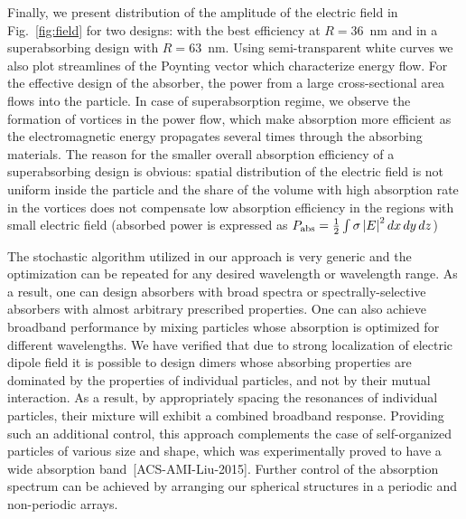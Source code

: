 \documentclass[twoside,twocolumn,9pt]{article}
\begin{document}
\begin{figure}[h]
\end{figure}
Finally, we present distribution of the amplitude of the electric
field in Fig.~\ref{fig:field} for two designs: with the best
efficiency at $R=36$~nm and in a superabsorbing design with $R=63$~nm.
Using semi-transparent white curves we also plot streamlines of the
Poynting vector which characterize energy flow.  For the effective
design of the absorber, the power from a large cross-sectional area
flows into the particle.  In case of superabsorption regime, we
observe the formation of vortices in the power flow, which make
absorption more efficient as the electromagnetic energy propagates
several times through the absorbing materials.  The reason for the
smaller overall absorption efficiency of a superabsorbing design is
obvious: spatial distribution of the electric field is not uniform
inside the particle and the share of the volume with high absorption
rate in the vortices does not compensate low absorption efficiency in
the regions with small electric field (absorbed power is expressed as
$P_{\rm abs}=\frac{1}{2}\int\sigma \left|E\right|^2dx\,dy\,dz$)

The stochastic algorithm utilized in our approach is very generic and
the optimization can be repeated for any desired wavelength or
wavelength range.  As a result, one can design absorbers with broad
spectra or spectrally-selective absorbers with almost arbitrary
prescribed properties.  One can also achieve broadband performance by
mixing particles whose absorption is optimized for different
wavelengths. We have verified that due to strong localization of
electric dipole field it is possible to design dimers whose absorbing
properties are dominated by the properties of individual particles,
and not by their mutual interaction. As a result, by appropriately
spacing the resonances of individual particles, their mixture will
exhibit a combined broadband response. Providing such an additional
control, this approach complements the case of self-organized
particles of various size and shape, which was experimentally proved
to have a wide absorption band~[ACS-AMI-Liu-2015]. %
Further control of the absorption spectrum can be achieved by
arranging our spherical structures in a periodic and non-periodic
arrays.
\end{document}

